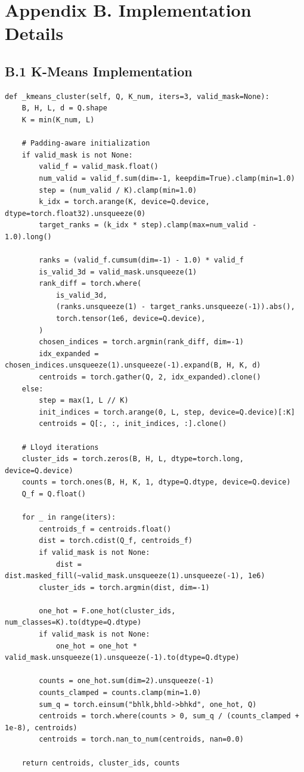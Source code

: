 \section{Appendix B. Implementation Details}

\subsection{B.1 K-Means Implementation}

\begin{lstlisting}
def _kmeans_cluster(self, Q, K_num, iters=3, valid_mask=None):
    B, H, L, d = Q.shape
    K = min(K_num, L)
    
    # Padding-aware initialization
    if valid_mask is not None:
        valid_f = valid_mask.float()
        num_valid = valid_f.sum(dim=-1, keepdim=True).clamp(min=1.0)
        step = (num_valid / K).clamp(min=1.0)
        k_idx = torch.arange(K, device=Q.device, dtype=torch.float32).unsqueeze(0)
        target_ranks = (k_idx * step).clamp(max=num_valid - 1.0).long()
        
        ranks = (valid_f.cumsum(dim=-1) - 1.0) * valid_f
        is_valid_3d = valid_mask.unsqueeze(1)
        rank_diff = torch.where(
            is_valid_3d,
            (ranks.unsqueeze(1) - target_ranks.unsqueeze(-1)).abs(),
            torch.tensor(1e6, device=Q.device),
        )
        chosen_indices = torch.argmin(rank_diff, dim=-1)
        idx_expanded = chosen_indices.unsqueeze(1).unsqueeze(-1).expand(B, H, K, d)
        centroids = torch.gather(Q, 2, idx_expanded).clone()
    else:
        step = max(1, L // K)
        init_indices = torch.arange(0, L, step, device=Q.device)[:K]
        centroids = Q[:, :, init_indices, :].clone()
    
    # Lloyd iterations
    cluster_ids = torch.zeros(B, H, L, dtype=torch.long, device=Q.device)
    counts = torch.ones(B, H, K, 1, dtype=Q.dtype, device=Q.device)
    Q_f = Q.float()
    
    for _ in range(iters):
        centroids_f = centroids.float()
        dist = torch.cdist(Q_f, centroids_f)
        if valid_mask is not None:
            dist = dist.masked_fill(~valid_mask.unsqueeze(1).unsqueeze(-1), 1e6)
        cluster_ids = torch.argmin(dist, dim=-1)
        
        one_hot = F.one_hot(cluster_ids, num_classes=K).to(dtype=Q.dtype)
        if valid_mask is not None:
            one_hot = one_hot * valid_mask.unsqueeze(1).unsqueeze(-1).to(dtype=Q.dtype)
        
        counts = one_hot.sum(dim=2).unsqueeze(-1)
        counts_clamped = counts.clamp(min=1.0)
        sum_q = torch.einsum("bhlk,bhld->bhkd", one_hot, Q)
        centroids = torch.where(counts > 0, sum_q / (counts_clamped + 1e-8), centroids)
        centroids = torch.nan_to_num(centroids, nan=0.0)
    
    return centroids, cluster_ids, counts
\end{lstlisting}

